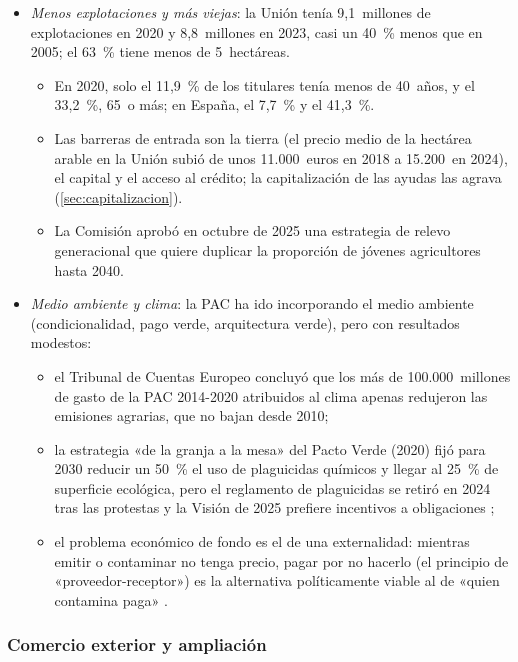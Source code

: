 \documentclass[11pt]{article}
\begin{document}
\begin{itemize}
\item \emph{Menos explotaciones y más viejas}: la Unión tenía 9,1~millones de explotaciones en 2020 y 8,8~millones en 2023, casi un 40~\% menos que en 2005; el 63~\% tiene menos de 5~hectáreas\nocite{Eurostat2026Explotaciones}.
  \begin{itemize}
  \item En 2020, solo el 11,9~\% de los titulares tenía menos de 40~años, y el 33,2~\%, 65~o más; en España, el 7,7~\% y el 41,3~\%\nocite{Eurostat2026Explotaciones}.
  \item Las barreras de entrada son la tierra (el precio medio de la hectárea arable en la Unión subió de unos 11.000~euros en 2018 a 15.200~en 2024\nocite{Eurostat2026PrecioTierra}), el capital y el acceso al crédito; la capitalización de las ayudas las agrava (\ref{sec:capitalizacion}).
  \item La Comisión aprobó en octubre de 2025 una estrategia de relevo generacional que quiere duplicar la proporción de jóvenes agricultores hasta 2040\nocite{CE2025Relevo}.
  \end{itemize}
\item \emph{Medio ambiente y clima}: la PAC ha ido incorporando el medio ambiente (condicionalidad, pago verde, arquitectura verde), pero con resultados modestos:
  \begin{itemize}
  \item el Tribunal de Cuentas Europeo concluyó que los más de 100.000~millones de gasto de la PAC 2014-2020 atribuidos al clima apenas redujeron las emisiones agrarias, que no bajan desde 2010\nocite{TCE2021Clima};
  \item la estrategia «de la granja a la mesa» del Pacto Verde (2020) fijó para 2030 reducir un 50~\% el uso de plaguicidas químicos y llegar al 25~\% de superficie ecológica, pero el reglamento de plaguicidas se retiró en 2024 tras las protestas y la Visión de 2025 prefiere incentivos a obligaciones ;
  \item el problema económico de fondo es el de una externalidad: mientras emitir o contaminar no tenga precio, pagar por no hacerlo (el principio de «proveedor-receptor») es la alternativa políticamente viable al de «quien contamina paga» .
  \end{itemize}
\end{itemize}

\subsubsection{Comercio exterior y ampliación}\label{sec:comercio-ampliacion}
\end{document}
